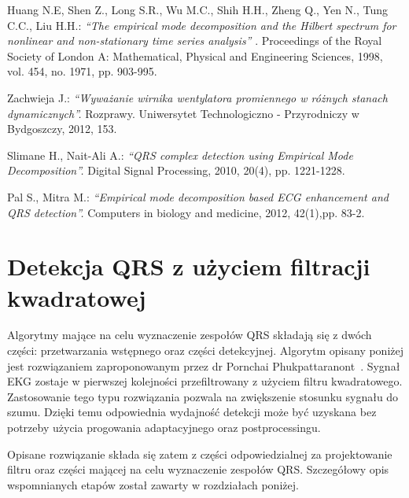 \documentclass[10pt,a4paper]{article}
\begin{document}
\clearpage

\begin{thebibliography}{9}

 
Huang N.E, Shen Z., Long S.R., Wu M.C., Shih H.H., Zheng Q., Yen N., Tung C.C., Liu
H.H.: \textit{“The empirical mode decomposition and the Hilbert spectrum for nonlinear and
non-stationary time series analysis” }. Proceedings of the Royal Society of London A:
Mathematical, Physical and Engineering Sciences, 1998, vol. 454, no. 1971, pp.
903-995.

 \vspace{0.5em}
 
Zachwieja J.: \textit{“Wyważanie wirnika wentylatora promiennego w różnych stanach
dynamicznych”.} Rozprawy. Uniwersytet Technologiczno - Przyrodniczy w Bydgoszczy,
2012, 153.

\vspace{0.5em}

Slimane H., Nait-Ali A.: \textit{“QRS complex detection using Empirical Mode Decomposition”.}
Digital Signal Processing, 2010, 20(4), pp. 1221-1228.

\vspace{0.5em}

Pal S., Mitra M.: \textit{“Empirical mode decomposition based ECG enhancement and QRS
detection”.} Computers in biology and medicine, 2012, 42(1),pp. 83-2.

\end{thebibliography}

\newpage
\section{Detekcja QRS z użyciem filtracji kwadratowej}
\bigskip
Algorytmy mające na celu wyznaczenie zespołów QRS składają się z dwóch części: przetwarzania wstępnego oraz części detekcyjnej. Algorytm opisany poniżej jest rozwiązaniem zaproponowanym przez dr Pornchai Phukpattaranont~\cite{QF article}. Sygnał EKG zostaje w pierwszej kolejności przefiltrowany z użyciem filtru kwadratowego. Zastosowanie tego typu rozwiązania pozwala na zwiększenie stosunku sygnału do szumu. Dzięki temu odpowiednia wydajność detekcji może być uzyskana bez potrzeby użycia progowania adaptacyjnego oraz postprocessingu.

Opisane rozwiązanie składa się zatem z części odpowiedzialnej za projektowanie filtru oraz części mającej na celu wyznaczenie zespołów QRS. Szczegółowy opis wspomnianych etapów został zawarty w rozdziałach poniżej.
\bigskip
\end{document}
